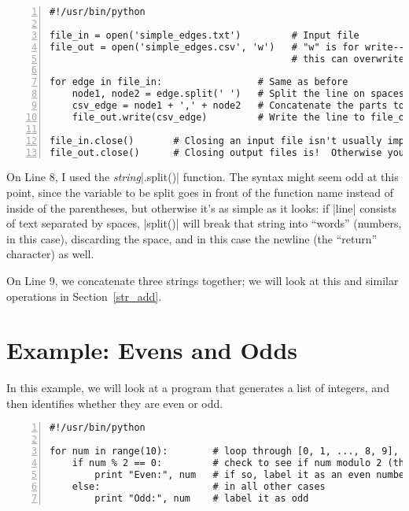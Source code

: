 \documentclass{article}
\begin{document}
\begin{Verbatim}[numbers=left, samepage=true]
#!/usr/bin/python

file_in = open('simple_edges.txt')         # Input file
file_out = open('simple_edges.csv', 'w')   # "w" is for write--be careful, since
                                           # this can overwrite an existing file!

for edge in file_in:                 # Same as before
    node1, node2 = edge.split(' ')   # Split the line on spaces
    csv_edge = node1 + ',' + node2   # Concatenate the parts together, comma-separated
    file_out.write(csv_edge)         # Write the line to file_out

file_in.close()       # Closing an input file isn't usually important
file_out.close()      # Closing output files is!  Otherwise you may lose data
\end{Verbatim}

On Line 8, I used the \textit{string}|.split()| function.  The syntax might seem odd at this point, since the variable to be split goes in front 
of the function name instead of inside of the parentheses, but otherwise it's as simple as it looks: if |line| consists of text separated
 by spaces, |split()| will break that string into ``words'' (numbers, in this case), discarding the space, and in this case the newline (the ``return'' character) as well.

On Line 9, we concatenate three strings together; we will look at this and similar operations in Section~\ref{str_add}.

\section{Example: Evens and Odds}

In this example, we will look at a program that generates a list of integers,
and then identifies whether they are even or odd.

\begin{Verbatim}[numbers=left, samepage=true]
#!/usr/bin/python

for num in range(10):        # loop through [0, 1, ..., 8, 9], storing each number in "num"
    if num % 2 == 0:         # check to see if num modulo 2 (the remainder) is zero
        print "Even:", num   # if so, label it as an even number
    else:                    # in all other cases
        print "Odd:", num    # label it as odd
\end{Verbatim}
\end{document}
